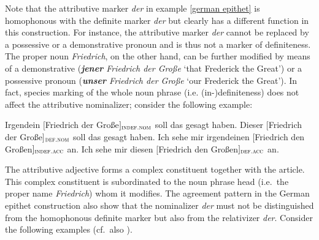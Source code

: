 Note that the attributive marker \textit{der} in example \ref{german epithet} is homophonous with the definite marker \textit{der} but clearly has a different function in this construction. For instance, the attributive marker \textit{der} cannot be replaced by a possessive or a demonstrative pronoun and is thus not a marker of definiteness. The proper noun \textit{Friedrich}, on the other hand, can be further modified by means of a demonstrative (\textit{\textbf{jener} Friedrich der Große} ‘that Frederick the Great’) or a possessive pronoun (\textit{\textbf{unser} Friedrich der Große} ‘our Frederick the Great’). In fact, species marking of the whole noun phrase (i.e. (in-)definiteness) does not affect the attributive nominalizer; consider the following example:
\begin{exe}
\ex
{}
\begin{xlist}
\ex	Irgendein $[$Friedrich der Große$]_{\textsc{indef.nom}}$ soll das gesagt haben.
\ex	Dieser $[$Friedrich der Große$]$$_{\textsc{def.nom}}$ soll das gesagt haben. 
\ex	Ich sehe mir irgendeinen $[$Friedrich den Großen$]_{\textsc{indef.acc}}$ an.
\ex	Ich sehe mir diesen $[$Friedrich den Großen$]_{\textsc{def.acc}}$ an.
\end{xlist}
\end{exe}
The attributive adjective forms a complex constituent together with the article. This complex constituent is subordinated to the noun phrase head (i.e.~the proper name \textit{Friedrich}) whom it modifies. The agreement pattern in the German epithet construction also show that the nominalizer \textit{der} must not be distinguished from the homophonous definite marker but also from the relativizer \textit{der}. Consider the following examples (cf.~also \citealt[181]{himmelmann1997}).
\begin{exe}
\ex \label{article versus rel}
\begin{xlist}
\end{xlist}
\end{exe}
